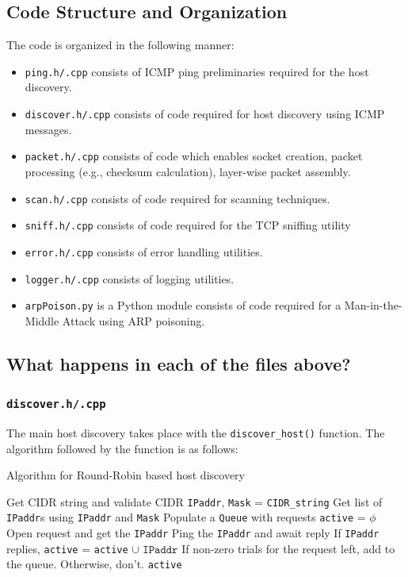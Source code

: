 \documentclass[12pt]{article}
\begin{document}
\subsection{Code Structure and Organization}
The code is organized in the following manner:
\begin{itemize}
    \item \texttt{ping.h/.cpp} consists of ICMP ping preliminaries required for the host discovery.
    \item \texttt{discover.h/.cpp} consists of code required for host discovery using ICMP messages.
    \item \texttt{packet.h/.cpp} consists of code which enables socket creation, packet processing (e.g., checksum calculation), layer-wise packet assembly.
    \item \texttt{scan.h/.cpp} consists of code required for scanning techniques.
    \item \texttt{sniff.h/.cpp} consists of code required for the TCP sniffing utility
    \item \texttt{error.h/.cpp} consists of error handling utilities.
    \item \texttt{logger.h/.cpp} consists of logging utilities.
    \item \texttt{arpPoison.py} is a Python module consists of code required for a Man-in-the-Middle Attack using ARP poisoning.
\end{itemize}

\subsection{What happens in each of the files above?}
\subsubsection{\texttt{discover.h/.cpp}}
The main host discovery takes place with the \texttt{discover\_host()} function. The algorithm followed by the function is as follows:
\begin{algorithm}
\caption{Algorithm for Round-Robin based host discovery}
\begin{algorithmic}[1]
\STATE Get CIDR string and validate CIDR
\STATE \texttt{IPaddr}, \texttt{Mask} = \texttt{CIDR\_string}
\STATE Get list of \texttt{IPaddr}s using \texttt{IPaddr} and \texttt{Mask}
\STATE Populate a \texttt{Queue} with requests
\STATE \texttt{active} = \(\phi\)
\STATE Open request and get the \texttt{IPaddr}
\STATE Ping the \texttt{IPaddr} and await reply
\STATE If \texttt{IPaddr} replies, \texttt{active} = \texttt{active} \(\cup \texttt{ IPaddr}\)
\ELSE
\STATE If non-zero trials for the request left, add to the queue. Otherwise, don't.
\ENDIF
\ENDWHILE
\RETURN \texttt{active}
\end{algorithmic}
\end{algorithm}
\end{document}
